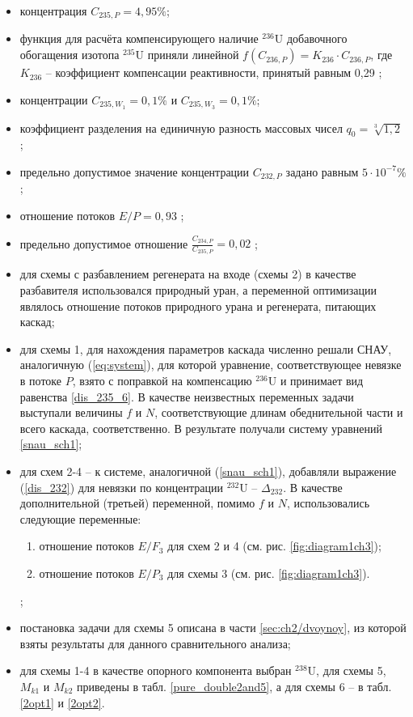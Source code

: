 \begin{itemize}
    \item концентрация $C_{235,{P}} = {4,95\%}$; 
    \item функция для расчёта компенсирующего наличие $^{236}$U добавочного обогащения изотопа $^{235}$U приняли линейной $f(C_{236,P}) = {K_{236}\cdot{C_{236,{P}}}}$, где $K_{236}$ -- коэффициент компенсации реактивности, принятый равным 0,29 \cite{smirnovEvolutionIsotopicComposition2012};
    \item концентрации $C_{235,{W_1}} = 0,1\%$ и $C_{235,{W_3}} = 0,1\%$;
    \item коэффициент разделения на единичную разность массовых чисел $q_{0} = \sqrt[3]{1,2}$ \cite{smirnovEvolutionIsotopicComposition2012};
    \item предельно допустимое значение концентрации $C_{232,{P}}$ задано равным $5\cdot10^{-7} \%$;
    \item отношение потоков $E/P = 0,93$ \cite{smirnovObogashchenieRegenerirovannogoUrana2018};
    \item предельно допустимое отношение $\frac{C_{234,{P}}}{C_{235,{P}}} = 0,02$ \cite{smirnovObogashchenieRegenerirovannogoUrana2018};
    \item для схемы с разбавлением регенерата на входе (схемы 2) в качестве разбавителя использовался природный уран, а переменной оптимизации являлось отношение потоков природного урана и регенерата, питающих каскад;
    \item для схемы 1, для нахождения параметров каскада численно решали СНАУ, аналогичную (\ref{eq:system}), для которой уравнение, соответствующее невязке в потоке $P$, взято с поправкой на компенсацию $^{236}$U и принимает вид равенства \ref{dis_235_6}. В качестве неизвестных переменных задачи выступали величины $f$ и $N$, соответствующие длинам обеднительной части и всего каскада, соответственно. В результате получали систему уравнений \ref{snau_sch1};
    \item для схем 2-4 -- к системе, аналогичной (\ref{snau_sch1}), добавляли выражение (\ref{dis_232}) для невязки по концентрации $^{232}$U -- $\Delta_{232}$. В качестве дополнительной (третьей) переменной, помимо $f$ и $N$, использовались следующие переменные:
    \begin{enumerate}
        \item отношение потоков $E/{F_3}$ для схем 2 и 4 (см. рис. \ref{fig:diagram1ch3});
        \item отношение потоков $E/{P_3}$ для схемы 3 (см. рис. \ref{fig:diagram1ch3}).
    \end{enumerate};
    \item постановка задачи для схемы 5 описана в части \ref{sec:ch2/dvoynoy}, из которой взяты результаты для данного сравнительного анализа;
    \item для схемы 1-4 в качестве опорного компонента выбран $^{238}$U, для схемы 5, $M_{k1}$ и $M_{k2}$ приведены в табл. \ref{pure_double2and5}, а для схемы 6 -- в табл. \ref{2opt1} и \ref{2opt2}.
\end{itemize}

